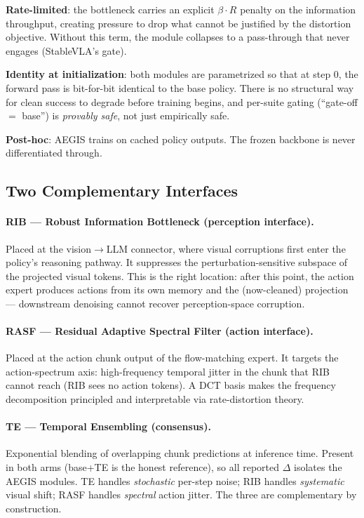 \documentclass[11pt,a4paper]{article}
\newcommand{\rib}{\textbf{RIB}}
\newcommand{\rasf}{\textbf{RASF}}
\newcommand{\te}{\textbf{TE}}
\begin{document}
\textbf{Rate-limited}: the bottleneck carries an explicit $\beta \cdot R$ penalty on
the information throughput, creating pressure to drop what cannot be justified by the
distortion objective. Without this term, the module collapses to a pass-through that never
engages (StableVLA's gate).

\textbf{Identity at initialization}: both modules are parametrized so that at step 0,
the forward pass is bit-for-bit identical to the base policy. There is no structural way for
clean success to degrade before training begins, and per-suite gating (``gate-off $=$ base'')
is \emph{provably safe}, not just empirically safe.

\textbf{Post-hoc}: AEGIS trains on cached policy outputs. The frozen backbone is never
differentiated through.

\subsection{Two Complementary Interfaces}

\paragraph{\rib{} — Robust Information Bottleneck (perception interface).}
Placed at the vision$\to$LLM connector, where visual corruptions first enter the policy's
reasoning pathway. It suppresses the perturbation-sensitive subspace of the projected visual
tokens. This is the right location: after this point, the action expert produces actions from
its own memory and the (now-cleaned) projection — downstream denoising cannot recover
perception-space corruption.

\paragraph{\rasf{} — Residual Adaptive Spectral Filter (action interface).}
Placed at the action chunk output of the flow-matching expert. It targets the
action-spectrum axis: high-frequency temporal jitter in the chunk that RIB cannot reach
(RIB sees no action tokens). A DCT basis makes the frequency decomposition principled and
interpretable via rate-distortion theory.

\paragraph{\te{} — Temporal Ensembling (consensus).}
Exponential blending of overlapping chunk predictions at inference time. Present in both
arms (base+TE is the honest reference), so all reported $\Delta$ isolates the AEGIS modules.
TE handles \emph{stochastic} per-step noise; RIB handles \emph{systematic} visual shift;
RASF handles \emph{spectral} action jitter. The three are complementary by construction.
\end{document}
